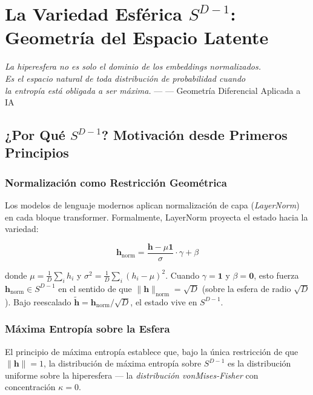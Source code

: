 \chapter{La Variedad Esférica $S^{D-1}$: Geometría del Espacio Latente}


\textit{La hiperesfera no es solo el dominio de los embeddings normalizados.\\
Es el espacio natural de toda distribución de probabilidad cuando\\
la entropía está obligada a ser máxima.} --- --- Geometría Diferencial Aplicada a IA

\section{¿Por Qué $S^{D-1}$? Motivación desde Primeros Principios}

\subsection{Normalización como Restricción Geométrica}

Los modelos de lenguaje modernos aplican normalización de capa (\textit{LayerNorm})
en cada bloque transformer. Formalmente, LayerNorm proyecta el estado hacia
la variedad:

\begin{equation}
\mathbf{h}_{\text{norm}} = \frac{\mathbf{h} - \mu \mathbf{1}}{\sigma} \cdot \gamma + \beta
\end{equation}

donde $\mu = \frac{1}{D}\sum_i h_i$ y $\sigma^2 = \frac{1}{D}\sum_i(h_i - \mu)^2$.
Cuando $\gamma = \mathbf{1}$ y $\beta = \mathbf{0}$, esto fuerza $\mathbf{h}_{\text{norm}} \in S^{D-1}$
en el sentido de que $\|{\mathbf{h}\|_{\text{norm}}} = \sqrt{D}$ (sobre la esfera de radio $\sqrt{D}$).
Bajo reescalado $\tilde{\mathbf{h}} = \mathbf{h}_{\text{norm}} / \sqrt{D}$, el estado vive en $S^{D-1}$.

\subsection{Máxima Entropía sobre la Esfera}

El principio de máxima entropía establece que, bajo la única restricción de
que $\|{\mathbf{h}\|} = 1$, la distribución de máxima entropía sobre $S^{D-1}$
es la distribución uniforme sobre la hiperesfera --- la \textit{distribución vonMises-Fisher}
con concentración $\kappa = 0$.

